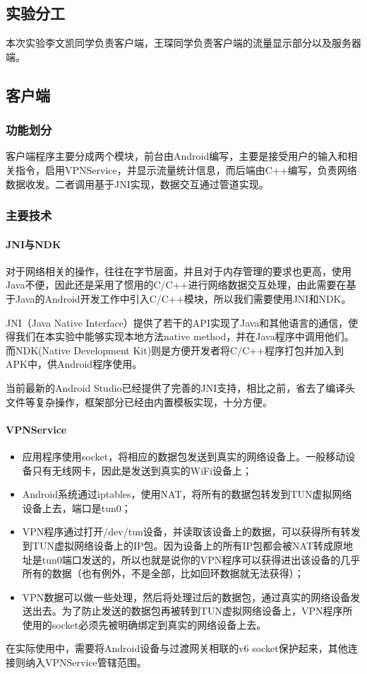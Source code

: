 \documentclass[paper=a4, fontsize=11pt, UTF8]{article} %
\begin{document}
\subsection{实验分工}
本次实验李文凯同学负责客户端，王琛同学负责客户端的流量显示部分以及服务器端。

\subsection{客户端}

\subsubsection{功能划分}
客户端程序主要分成两个模块，前台由Android编写，主要是接受用户的输入和相关指令，启用VPNService，并显示流量统计信息，而后端由C++编写，负责网络数据收发。二者调用基于JNI实现，数据交互通过管道实现。

\subsubsection{主要技术}
\paragraph{JNI与NDK}
对于网络相关的操作，往往在字节层面，并且对于内存管理的要求也更高，使用Java不便，因此还是采用了惯用的C/C++进行网络数据交互处理，由此需要在基于Java的Android开发工作中引入C/C++模块，所以我们需要使用JNI和NDK。

​JNI（Java Native Interface）提供了若干的API实现了Java和其他语言的通信，使得我们在本实验中能够实现本地方法native method，并在Java程序中调用他们。而NDK(Native Development Kit)则是方便开发者将C/C++程序打包并加入到APK中，供Android程序使用。

​当前最新的Android Studio已经提供了完善的JNI支持，相比之前，省去了编译头文件等复杂操作，框架部分已经由内置模板实现，十分方便。

\paragraph{VPNService}
\begin{itemize}
    \item 应用程序使用socket，将相应的数据包发送到真实的网络设备上。一般移动设备只有无线网卡，因此是发送到真实的WiFi设备上；
    \item Android系统通过iptables，使用NAT，将所有的数据包转发到TUN虚拟网络设备上去，端口是tun0；
    \item VPN程序通过打开/dev/tun设备，并读取该设备上的数据，可以获得所有转发到TUN虚拟网络设备上的IP包。因为设备上的所有IP包都会被NAT转成原地址是tun0端口发送的，所以也就是说你的VPN程序可以获得进出该设备的几乎所有的数据（也有例外，不是全部，比如回环数据就无法获得）；
    \item VPN数据可以做一些处理，然后将处理过后的数据包，通过真实的网络设备发送出去。为了防止发送的数据包再被转到TUN虚拟网络设备上，VPN程序所使用的socket必须先被明确绑定到真实的网络设备上去。
\end{itemize}
在实际使用中，需要将Android设备与过渡网关相联的v6 socket保护起来，其他连接则纳入VPNService管辖范围。
\end{document}
